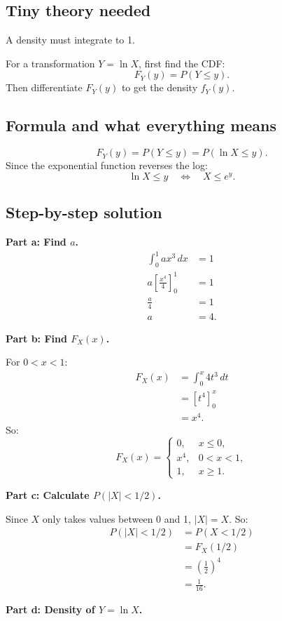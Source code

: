 \documentclass[11pt,a4paper]{article}
\begin{document}
\subsection*{Tiny theory needed}
A density must integrate to 1.

For a transformation \(Y=\ln X\), first find the CDF:
\[
F_Y(y)=P(Y\le y).
\]
Then differentiate \(F_Y(y)\) to get the density \(f_Y(y)\).

\subsection*{Formula and what everything means}
\[
F_Y(y)=P(Y\le y)=P(\ln X\le y).
\]
Since the exponential function reverses the log:
\[
\ln X\le y \quad \Longleftrightarrow \quad X\le e^y.
\]

\subsection*{Step-by-step solution}
\textbf{Part a: Find \(a\).}
\begin{align*}
\int_0^1 ax^3\,dx&=1\\
a\left[\frac{x^4}{4}\right]_0^1&=1\\
\frac{a}{4}&=1\\
a&=4.
\end{align*}

\textbf{Part b: Find \(F_X(x)\).}

For \(0<x<1\):
\begin{align*}
F_X(x)
&=\int_0^x 4t^3\,dt\\
&=[t^4]_0^x\\
&=x^4.
\end{align*}
So:
\[
F_X(x)=
\begin{cases}
0, & x\le 0,\\
x^4, & 0<x<1,\\
1, & x\ge 1.
\end{cases}
\]

\textbf{Part c: Calculate \(P(|X|<1/2)\).}

Since \(X\) only takes values between 0 and 1, \(|X|=X\). So:
\begin{align*}
P(|X|<1/2)
&=P(X<1/2)\\
&=F_X(1/2)\\
&=\left(\frac{1}{2}\right)^4\\
&=\frac{1}{16}.
\end{align*}

\textbf{Part d: Density of \(Y=\ln X\).}
\end{document}
